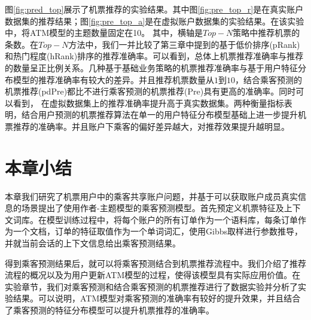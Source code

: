 \begin{figure}
\centering
{}
\end{figure}

图\ref{fig:pred_top}展示了机票推荐的实验结果。其中图\ref{fig:pre_top_r}是在真实账户数据集的推荐结果；图\ref{fig:pre_top_a}是在虚拟账户数据集的实验结果。在该实验中，将ATM模型的主题数量固定在10。
其中，横轴是$Top-N$策略中推荐机票的条数。在$Top-N$方法中，我们一并比较了第三章中提到的基于低价排序(pRank)和热门程度(hRank)排序的推荐准确率。可以看到，总体上机票推荐准确率与推荐的数量呈正比例关系。几种基于基础业务策略的机票推荐准确率与基于用户特征分布模型的推荐准确率有较大的差异。并且推荐机票数量从$1$到$10$，结合乘客预测的机票推荐(pdPre)都比不进行乘客预测的机票推荐(Pre)具有更高的准确率。同时可以看到，
在虚拟数据集上的推荐准确率提升高于真实数据集。两种衡量指标表明，结合用户预测的机票推荐算法在单一的用户特征分布模型基础上进一步提升机票推荐的准确率。并且账户下乘客的偏好差异越大，对推荐效果提升越明显。


\section{本章小结}

本章我们研究了机票用户中的乘客共享账户问题，并基于可以获取账户成员真实信息的场景提出了使用作者-主题模型的乘客预测模型。首先预定义机票特征及上下文词库。在模型训练过程中，将每个账户的所有订单作为一个语料库，每条订单作为一个文档，订单的特征取值作为一个单词词汇，使用Gibbs取样进行参数推导，并就当前会话的上下文信息给出乘客预测结果。

得到乘客预测结果后，就可以将乘客预测结合到机票推荐流程中。我们介绍了推荐流程的概况以及为用户更新ATM模型的过程，使得该模型具有实际应用价值。在实验章节，我们对乘客预测和结合乘客预测的机票推荐进行了数据实验并分析了实验结果。可以说明，ATM模型对乘客预测的准确率有较好的提升效果，并且结合了乘客预测的特征分布模型可以提升机票推荐的准确率。